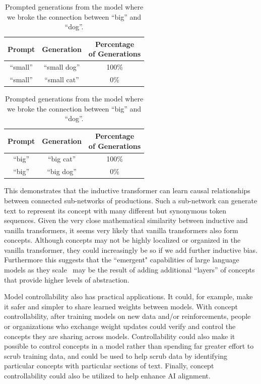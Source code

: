 \documentclass{article}
\begin{document}
\begin{table}[H]
\begin{center}
\begin{tabular}{ccc}
\hline\hline
Prompt & Generation &  \thead{Percentage \\ of Generations} \\[1ex]
\hline\hline
``small'' & ``small dog'' & 100\% \\
``small'' & ``small cat'' & 0\% \\
\hline
\end{tabular}
\quad\quad\quad
\begin{tabular}{ccc}
\hline\hline
Prompt & Generation &  \thead{Percentage \\ of Generations} \\[1ex]
\hline
``big'' & ``big cat'' & 100\% \\
``big'' & ``big dog'' & 0\% \\
\hline
\end{tabular}
\caption{Prompted generations from the model where we broke the connection between ``big'' and ``dog''.}
\end{center}
\end{table}

This demonstrates that the inductive transformer can learn causal relationships between connected sub-networks of productions. Such a sub-network can generate text to represent its concept with many different but synonymous token sequences. Given the very close mathematical similarity between inductive and vanilla transformers, it seems very likely that vanilla transformers also form concepts.  Although concepts may not be highly localized or organized in the vanilla transformer, they could increasingly be so if we add further inductive bias. Furthermore this suggests that the ``emergent" capabilities of large language models as they scale~\citep{wei2022emergent} may be the result of adding additional ``layers'' of concepts that provide higher levels of abstraction.

Model controllability also has practical applications.  It could, for example, make it safer and simpler to share learned weights between models. With concept controllability, after training models on new data and/or reinforcements, people or organizations who exchange weight updates could verify and control the concepts they are sharing across models. Controllability could also make it possible to control concepts in a model rather than spending far greater effort to scrub training data, and could be used to help scrub data by identifying particular concepts with particular sections of text. Finally, concept controllability could also be utilized to help enhance AI alignment.
\end{document}
